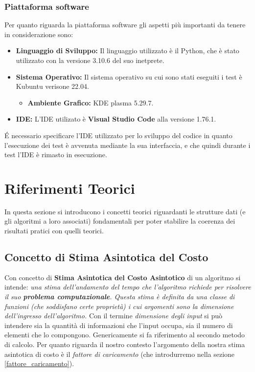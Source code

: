 \documentclass{article}
\begin{document}
\subsubsection{Piattaforma software}

Per quanto riguarda la piattaforma software gli aspetti più importanti da tenere in considerazione sono:
\begin{itemize}
\item \textbf{Linguaggio di Sviluppo:} Il linguaggio utilizzato è il Python, che è stato utilizzato con la versione 3.10.6 del suo inetprete.
\item \textbf{Sistema Operativo:} Il sistema operativo su cui sono stati eseguiti i test è Kubuntu verisone 22.04.
\begin{itemize}
\item \textbf{Ambiente Grafico:} KDE plasma 5.29.7.
\end{itemize}
\item \textbf{IDE:} L'IDE utilizato è \textbf{Visual Studio Code} alla versione 1.76.1.
\end{itemize}
\'E necessario specificare l'IDE utilizzato per lo sviluppo del codice in quanto l'esecuzione dei test è avvenuta mediante la sua interfaccia, e che quindi durante i test l'IDE è rimasto in esecuzione. 
\section{Riferimenti Teorici}

In questa sezione si introducono i concetti teorici riguardanti le strutture dati (e gli algoritmi a loro associati) fondamentali per poter stabilire la coerenza dei risultati pratici con quelli teorici. 
\subsection{Concetto di Stima Asintotica del Costo}

Con concetto di \textbf{Stima Asintotica  del Costo Asintotico} di un algoritmo si intende: \emph{una stima dell'andamento del tempo che l'algoritmo richiede per risolvere il suo \textbf{problema computazionale}. Questa stima è definita da una classe di funzioni (che soddisfano certe proprietà) i cui argomenti sono la dimensione dell'ingresso dell'algoritmo.}
Con il termine \emph{dimensione degli input} si può intendere sia la quantità di informazioni che l'input occupa, sia il numero di elementi che lo compongono. Genericamente si fa riferimento al secondo metodo di calcolo. Per quanto riguarda il nostro contesto l'argomento della nostra stima asintotica di costo è il \emph{fattore di caricamento} (che introdurremo nella sezione \ref{fattore_caricamento}).
\end{document}
